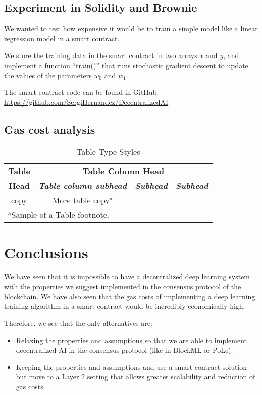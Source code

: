 \documentclass[conference]{IEEEtran}
\begin{document}
\subsection{Experiment in Solidity and Brownie}

We wanted to test how expensive it would be to train a simple model like a linear regression model in a smart contract.

We store the training data in the smart contract in two arrays $x$ and $y$, and implement a function ``train()'' that runs stochastic gradient descent to update the values of the parameters $w_0$ and $w_1$.

The smart contract code can be found in GitHub: \url{https://github.com/SergiHernandez/DecentralizedAI}

\subsection{Gas cost analysis}


\begin{table}[htbp]
\caption{Table Type Styles}
\begin{center}
\begin{tabular}{|c|c|c|c|}
\hline
\textbf{Table}&\multicolumn{3}{|c|}{\textbf{Table Column Head}} \\
\cline{2-4} 
\textbf{Head} & \textbf{\textit{Table column subhead}}& \textbf{\textit{Subhead}}& \textbf{\textit{Subhead}} \\
\hline
copy& More table copy$^{\mathrm{a}}$& &  \\
\hline
\multicolumn{4}{l}{$^{\mathrm{a}}$Sample of a Table footnote.}
\end{tabular}
\label{tab1}
\end{center}
\end{table}

\section{Conclusions}

We have seen that it is impossible to have a decentralized deep learning system with the properties we suggest implemented in the consensus protocol of the blockchain. We have also seen that the gas costs of implementing a deep learning training algorithm in a smart contract would be incredibly economically high.

Therefore, we see that the only alternatives are:
\begin{itemize}
\item Relaxing the properties and assumptions so that we are able to implement decentralized AI in the consensus protocol (like in BlockML or PoLe).
\item Keeping the properties and assumptions and use a smart contract solution but move to a Layer 2 setting that allows greater scalability and reduction of gas costs.
\end{itemize}
\end{document}

